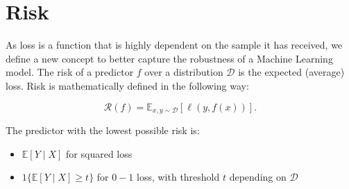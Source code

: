 

\section{Risk}


As loss is a function that is highly dependent on the sample it has received, we define a new concept to better capture the robustness of a Machine Learning model. The risk of a predictor $f$ over a distribution $\mathcal{D}$ is the expected (average) loss. Risk is mathematically defined in the following way:

$$\mathcal{R}(f)=\mathbb{E}_{x, y \sim \mathcal{D}}[\ell(y, f(x))].$$
\newline 

\noindent

\begin{claim}
    The predictor with the lowest possible risk is: 
    \begin{itemize}
        \item $\mathbb{E}[Y \mid X]$ for squared loss
        \item $1\{\mathbb{E}[Y \mid X] \geq t\}$ for $0-1$ loss, with threshold $t$ depending on $\mathcal{D}$
    \end{itemize}
\end{claim}


